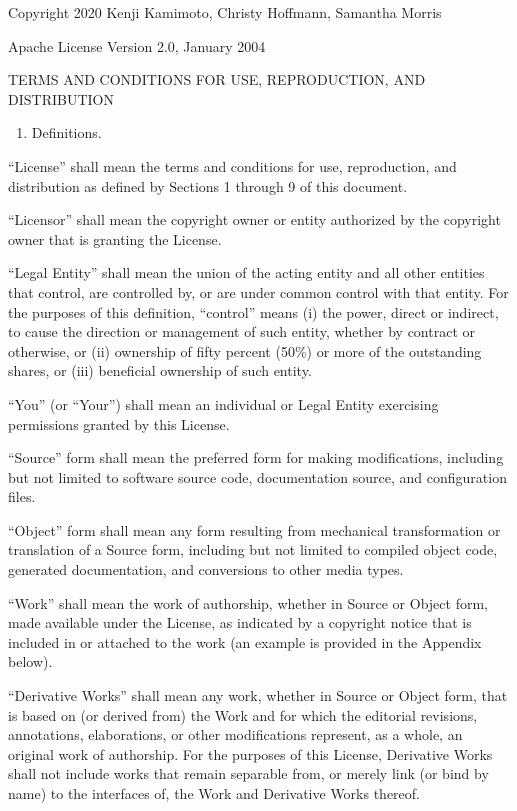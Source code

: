 \documentclass[letterpaper,10pt,english]{sphinxmanual}
\begin{document}
Copyright 2020 Kenji Kamimoto, Christy Hoffmann, Samantha Morris

Apache License
Version 2.0, January 2004

TERMS AND CONDITIONS FOR USE, REPRODUCTION, AND DISTRIBUTION
\begin{enumerate}
%
\item {} 
Definitions.

\end{enumerate}

“License” shall mean the terms and conditions for use, reproduction,
and distribution as defined by Sections 1 through 9 of this document.

“Licensor” shall mean the copyright owner or entity authorized by
the copyright owner that is granting the License.

“Legal Entity” shall mean the union of the acting entity and all
other entities that control, are controlled by, or are under common
control with that entity. For the purposes of this definition,
“control” means (i) the power, direct or indirect, to cause the
direction or management of such entity, whether by contract or
otherwise, or (ii) ownership of fifty percent (50\%) or more of the
outstanding shares, or (iii) beneficial ownership of such entity.

“You” (or “Your”) shall mean an individual or Legal Entity
exercising permissions granted by this License.

“Source” form shall mean the preferred form for making modifications,
including but not limited to software source code, documentation
source, and configuration files.

“Object” form shall mean any form resulting from mechanical
transformation or translation of a Source form, including but
not limited to compiled object code, generated documentation,
and conversions to other media types.

“Work” shall mean the work of authorship, whether in Source or
Object form, made available under the License, as indicated by a
copyright notice that is included in or attached to the work
(an example is provided in the Appendix below).

“Derivative Works” shall mean any work, whether in Source or Object
form, that is based on (or derived from) the Work and for which the
editorial revisions, annotations, elaborations, or other modifications
represent, as a whole, an original work of authorship. For the purposes
of this License, Derivative Works shall not include works that remain
separable from, or merely link (or bind by name) to the interfaces of,
the Work and Derivative Works thereof.
\end{document}
